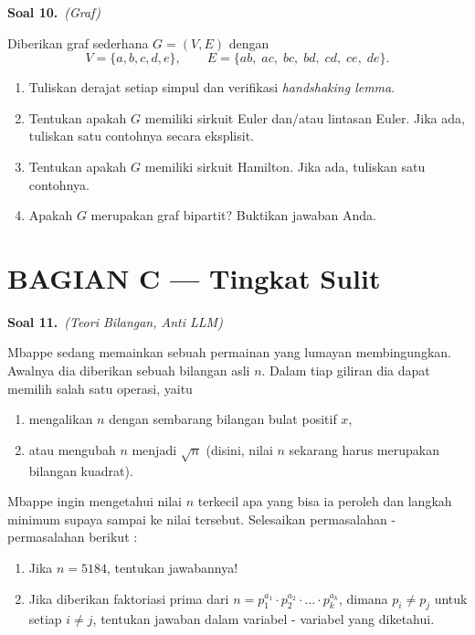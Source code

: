 \documentclass[11pt,a4paper]{article}
\newcommand{\soal}[2]{%
  \vspace{4pt}\noindent\textbf{Soal #1.}\ \textit{(#2)}\par\nobreak\vspace{2pt}}
\begin{document}
\soal{10}{Graf}
Diberikan graf sederhana $G = (V,E)$ dengan
\[
V = \{a,b,c,d,e\}, \qquad
E = \{ab,\; ac,\; bc,\; bd,\; cd,\; ce,\; de\}.
\]

\begin{center}
\end{center}

\begin{enumerate}[label=(\alph*),leftmargin=*]
  \item Tuliskan derajat setiap simpul dan verifikasi \emph{handshaking lemma}.
  \item Tentukan apakah $G$ memiliki sirkuit Euler dan/atau lintasan Euler.
        Jika ada, tuliskan satu contohnya secara eksplisit.
  \item Tentukan apakah $G$ memiliki sirkuit Hamilton. Jika ada, tuliskan satu contohnya.
  \item Apakah $G$ merupakan graf bipartit? Buktikan jawaban Anda.
\end{enumerate}

\section*{BAGIAN C --- Tingkat Sulit}

\soal{11}{Teori Bilangan, Anti LLM}
Mbappe sedang memainkan sebuah permainan yang lumayan membingungkan. Awalnya dia diberikan sebuah bilangan asli $n$. Dalam tiap giliran dia dapat memilih salah satu operasi, yaitu \begin{enumerate}
    \item mengalikan $n$ dengan sembarang bilangan bulat positif $x$,
    \item atau mengubah $n$ menjadi $\sqrt n$ (disini, nilai $n$ sekarang harus merupakan bilangan kuadrat).
\end{enumerate}  
Mbappe ingin mengetahui nilai $n$ terkecil apa yang bisa ia peroleh dan langkah minimum supaya sampai ke nilai tersebut. Selesaikan permasalahan - permasalahan berikut : 
\begin{enumerate}[label=(\alph*),leftmargin=*]
    \item Jika $n = 5184$, tentukan jawabannya!
    \item Jika diberikan faktoriasi prima dari $n = p_1^{a_1}\cdot p_2^{a_2}\cdot\dots\cdot p_k^{a_k}$, dimana $p_i \neq p_j$ untuk setiap $i\neq j$, tentukan jawaban dalam variabel - variabel yang diketahui.
\end{enumerate}
\end{document}
